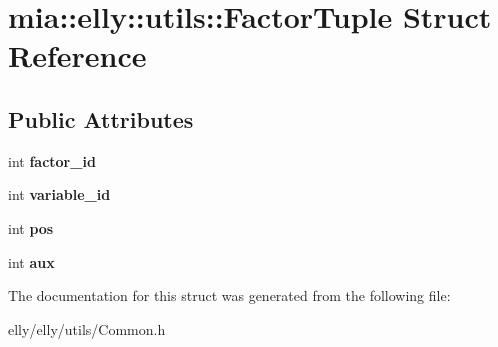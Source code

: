 \hypertarget{structmia_1_1elly_1_1utils_1_1_factor_tuple}{\section{mia\-:\-:elly\-:\-:utils\-:\-:Factor\-Tuple Struct Reference}
\label{structmia_1_1elly_1_1utils_1_1_factor_tuple}
}
\subsection*{Public Attributes}
\begin{DoxyCompactItemize}
\item 
\hypertarget{structmia_1_1elly_1_1utils_1_1_factor_tuple_a6ac34976c6a9f09302811418be276918}{int {\bfseries factor\-\_\-id}}\label{structmia_1_1elly_1_1utils_1_1_factor_tuple_a6ac34976c6a9f09302811418be276918}

\item 
\hypertarget{structmia_1_1elly_1_1utils_1_1_factor_tuple_a9508c76cec185c05d436cbc92e473155}{int {\bfseries variable\-\_\-id}}\label{structmia_1_1elly_1_1utils_1_1_factor_tuple_a9508c76cec185c05d436cbc92e473155}

\item 
\hypertarget{structmia_1_1elly_1_1utils_1_1_factor_tuple_a5f6a90de690c411850aee354c15776c7}{int {\bfseries pos}}\label{structmia_1_1elly_1_1utils_1_1_factor_tuple_a5f6a90de690c411850aee354c15776c7}

\item 
\hypertarget{structmia_1_1elly_1_1utils_1_1_factor_tuple_a3e51d19b5826a516c691a15be89cec5a}{int {\bfseries aux}}\label{structmia_1_1elly_1_1utils_1_1_factor_tuple_a3e51d19b5826a516c691a15be89cec5a}

\end{DoxyCompactItemize}


The documentation for this struct was generated from the following file\-:\begin{DoxyCompactItemize}
\item 
elly/elly/utils/Common.\-h\end{DoxyCompactItemize}
